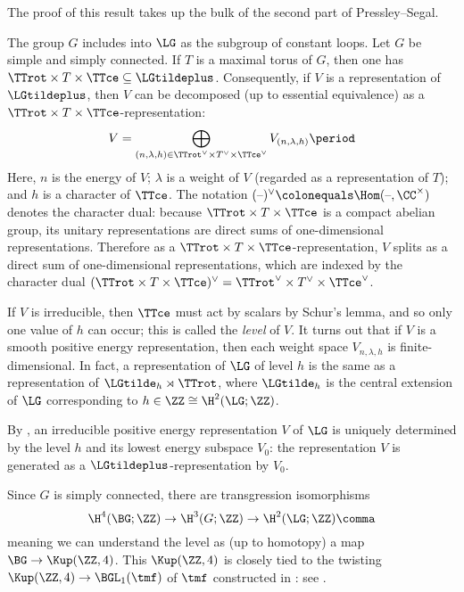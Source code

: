 The proof of this result takes up the bulk of the second part of Pressley--Segal.

\begin{remark}\label{pos-energy}
	The group $G$ includes into $\LG$ as the subgroup of constant loops. Let $G$
	be simple and simply connected. If $T$ is a maximal torus of $G$, then one
	has $\TTrot \times T\times \TTce \subseteq \LGtildeplus$. Consequently, if
	$V$ is a representation of $\LGtildeplus$, then $V$ can be decomposed (up to
	essential equivalence) as a $\TTrot \times T\times
	\TTce$-representation:
	\begin{equation}
		V = \bigoplus_{(n,\lambda, h) \in \TTrot^\vee \times T^\vee\times
	\TTce^\vee} V_{(n,\lambda,h)}\period
	\end{equation}
	Here, $n$ is the energy of $V$; $\lambda$ is a weight of $V$ (regarded
	as a representation of $T$); and $h$ is a character of $\TTce$. The notation $(\text{--})^\vee \colonequals
	\Hom(\text{--}, \CC^\times)$ denotes the character dual: because
	$\TTrot\times T\times\TTce$ is a compact abelian group, its unitary representations are direct sums of
	one-dimensional representations. Therefore as a $\TTrot\times T\times\TTce$-representation, $V$ splits as a
	direct sum of one-dimensional representations, which are indexed by the character dual $(\TTrot\times
	T\times\TTce)^\vee = \TTrot^\vee \times T^\vee\times
	\TTce^\vee$.
	
	If $V$ is
	irreducible, then $\TTce$ must act by scalars by Schur's lemma, and so
	only one value of $h$ can occur; this is called the \emph{level} of $V$. It
	turns out that if $V$ is a smooth positive energy representation, then each
	weight space $V_{n,\lambda,h}$ is finite-dimensional. In fact, a
	representation of $\LG$ of level $h$ is the same as a representation of
	$\LGtilde_h\rtimes \TTrot$, where $\LGtilde_h$ is the central extension of
	$\LG$ corresponding to $h\in \ZZ \cong \H^2(\LG;\ZZ)$.
\end{remark}

\begin{remark}
	By , an irreducible positive energy representation
	$V$ of $\LG$ is uniquely determined by the level $h$ and its lowest energy
	subspace $V_0$: the representation $V$ is generated as a
	$\LGtildeplus$-representation by $V_0$.
\end{remark}

\begin{remark}
	Since $G$ is simply connected, there are transgression isomorphisms
	\begin{equation*}
		\H^4(\BG;\ZZ)\to\H^3(G;\ZZ)\to\H^2(\LG;\ZZ) \comma
	\end{equation*}
	meaning we can understand the level as (up to homotopy)
	a map $\BG\to \Kup(\ZZ,4)$. This $\Kup(\ZZ,4)$ is closely tied to the
	twisting $\Kup(\ZZ,4)\to \BGL_1(\tmf)$ of $\tmf$ constructed in \cite[Theorem 1.1]{ABG10}: see \cite{And00,
	Gro07, BET21}.
\end{remark}

